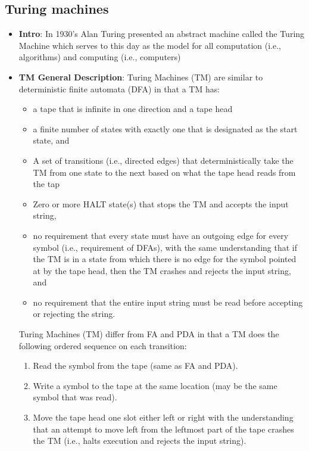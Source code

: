 \documentclass{report}
\begin{document}
    \pagebreak 
    \subsection{Turing machines}
    \begin{itemize}
        \item \textbf{Intro}: In 1930's Alan Turing presented an abstract machine called the Turing Machine which serves to this day as the model for all computation (i.e., algorithms) and computing (i.e., computers)
        \item \textbf{TM General Description}: Turing Machines (TM) are similar to deterministic finite automata (DFA) in that a TM has:
            \begin{itemize}
                \item a tape that is infinite in one direction and a tape head
                \item a finite number of states with exactly one that is designated as the start state, and
                \item A set of transitions (i.e., directed edges) that deterministically take the TM from one state to the next based on what the tape head reads from the tap
                \item Zero or more HALT state(s) that stops the TM and accepts the input string,
                \item no requirement that every state must have an outgoing edge for every symbol (i.e., requirement of DFAs), with the same understanding that if the TM is in a state from which there is no edge for the symbol pointed at by the tape head, then the TM crashes and rejects the input string, and
                \item no requirement that the entire input string must be read before accepting or rejecting the string.
            \end{itemize}
            \bigbreak \noindent 
            Turing Machines (TM) differ from FA and PDA in that a TM does the following ordered sequence on each transition:
            \begin{enumerate}
                \item Read the symbol from the tape (same as FA and PDA).
                \item Write a symbol to the tape at the same location (may be the same symbol that was read).
                \item Move the tape head one slot either left or right with the understanding that an attempt to move left from the leftmost part of the tape crashes the TM (i.e., halts execution and rejects the input string).

\end{enumerate}
\end{itemize}
\end{document}
